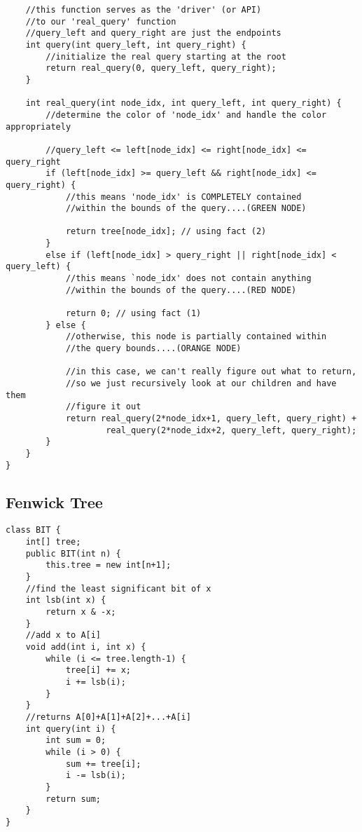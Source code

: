 \documentclass[11pt]{article}
\theoremstyle{plain}
\theoremstyle{definition}
\begin{document}
\begin{lstlisting}
	//this function serves as the 'driver' (or API)
	//to our 'real_query' function
	//query_left and query_right are just the endpoints
	int query(int query_left, int query_right) {
		//initialize the real query starting at the root
		return real_query(0, query_left, query_right);
	}

	int real_query(int node_idx, int query_left, int query_right) {
		//determine the color of 'node_idx' and handle the color appropriately

		//query_left <= left[node_idx] <= right[node_idx] <= query_right
		if (left[node_idx] >= query_left && right[node_idx] <= query_right) {
			//this means 'node_idx' is COMPLETELY contained
			//within the bounds of the query....(GREEN NODE)

			return tree[node_idx]; // using fact (2)
		}
		else if (left[node_idx] > query_right || right[node_idx] < query_left) {
			//this means `node_idx' does not contain anything
			//within the bounds of the query....(RED NODE)

			return 0; // using fact (1)
		} else {
			//otherwise, this node is partially contained within
			//the query bounds....(ORANGE NODE)

			//in this case, we can't really figure out what to return,
			//so we just recursively look at our children and have them
			//figure it out
			return real_query(2*node_idx+1, query_left, query_right) +
					real_query(2*node_idx+2, query_left, query_right);
		}
	}
}
\end{lstlisting}
\newpage
\subsection{Fenwick Tree}
\begin{lstlisting}
class BIT {
	int[] tree;
	public BIT(int n) {
		this.tree = new int[n+1];
	}
	//find the least significant bit of x
	int lsb(int x) {
		return x & -x;
	}
	//add x to A[i]
	void add(int i, int x) {
		while (i <= tree.length-1) {
			tree[i] += x;
			i += lsb(i);
		}
	}
	//returns A[0]+A[1]+A[2]+...+A[i]
	int query(int i) {
		int sum = 0;
		while (i > 0) {
			sum += tree[i];
			i -= lsb(i);
		}
		return sum;
	}
}
\end{lstlisting}
\end{document}
